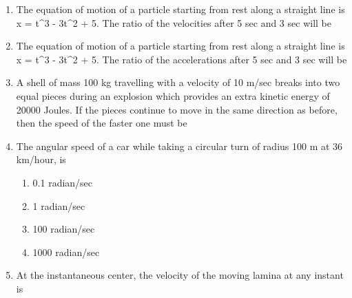 \documentclass[11pt,a4paper]{article}
\begin{document}
\begin{enumerate}
\begin{enumerate*}[itemjoin=\qquad, label=\Alph*.]
\end{enumerate*}
\item{The equation of motion of a particle starting from rest along a straight line is x = t\^{}3 - 3t\^{}2 + 5. The ratio of the velocities after 5 sec and 3 sec will be}
\\
\item{The equation of motion of a particle starting from rest along a straight line is x = t\^{}3 - 3t\^{}2 + 5. The ratio of the accelerations after 5 sec and 3 sec will be
}
\\
\item{A shell of mass 100 kg travelling with a velocity of 10 m/sec breaks into two equal pieces during an explosion which provides an extra kinetic energy of 20000 Joules. If the pieces continue to move in the same direction as before, then the speed of the faster one must be}
\\
\item{The angular speed of a car while taking a circular turn of radius 100 m at 36 km/hour, is}
\begin{enumerate}[label=\Alph*.]
\item{0.1 radian/sec}
\item{1 radian/sec}
\item{100 radian/sec}
\item{1000 radian/sec}
\end{enumerate}
\item{At the instantaneous center, the velocity of the moving lamina at any instant is}

\end{enumerate}
\end{document}
